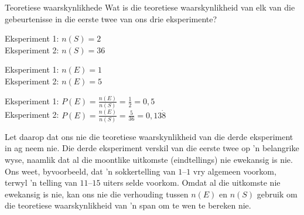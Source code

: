 \vspace*{-20pt}
\begin{wex}{Teoretiese waarskynlikhede}{
Wat is die teoretiese waarskynlikheid van elk van die gebeurtenisse in die eerste twee van ons drie eksperimente?\\
}{

  
 Eksperiment 1: $n(S) = 2$\\
 Eksperiment 2: $n(S) = 36$\\
  
  


 Eksperiment 1: $n(E) = 1$\\
 Eksperiment 2: $n(E) = 5$\\




  Eksperiment 1: $P(E) = \frac{n(E)}{n(S)} = \frac{1}{2} = 0,5$\\
  Eksperiment 2: $P(E) = \frac{n(E)}{n(S)} = \frac{5}{36} = 0,13\dot{8}$\\
}
\end{wex}

Let daarop dat ons nie die teoretiese waarskynlikheid van die derde eksperiment in ag neem nie. Die derde eksperiment verskil van die eerste twee op 'n belangrike wyse, naamlik dat al die moontlike uitkomste (eindtellings) nie ewekansig is nie. Ons weet, byvoorbeeld, dat 'n sokkertelling van $1$--$1$ vry algemeen voorkom, terwyl 'n telling van $11$--$15$ uiters selde voorkom. Omdat al die uitkomste nie ewekansig is nie, kan ons nie die verhouding tussen \(n(E)\) en \(n(S)\) gebruik om die teoretiese waarskynlikheid van 'n span om te wen te bereken nie.\par

